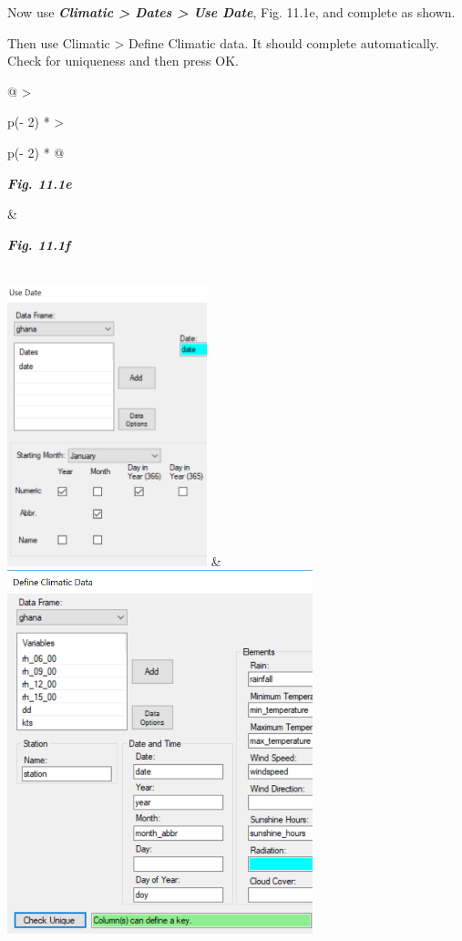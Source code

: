 \documentclass[
  letterpaper,
  DIV=11,
  numbers=noendperiod]{scrreprt}
\begin{document}
Now use \textbf{\emph{Climatic \textgreater{} Dates \textgreater{} Use
Date}}, Fig. 11.1e, and complete as shown.

Then use Climatic \textgreater{} Define Climatic data. It should
complete automatically. Check for uniqueness and then press OK.

\begin{longtable}[]{@{}
  >{\raggedright\arraybackslash}p{(\columnwidth - 2\tabcolsep) * }
  >{\raggedright\arraybackslash}p{(\columnwidth - 2\tabcolsep) * }@{}}
\toprule\noalign{}
\begin{minipage}[b]{\linewidth}\raggedright
\textbf{\emph{Fig. 11.1e}}
\end{minipage} & \begin{minipage}[b]{\linewidth}\raggedright
\textbf{\emph{Fig. 11.1f}}
\end{minipage} \\
\midrule\noalign{}
\endhead
\bottomrule\noalign{}
\endlastfoot
\includegraphics[width=2.28208in,height=3.2166in]{figures/Fig11.1e.png}
&
\includegraphics[width=3.49147in,height=4.14862in]{figures/Fig11.1f.png} \\
\end{longtable}
\end{document}
